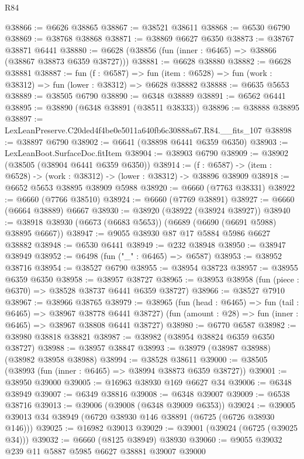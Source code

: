\begin{lexlean}{R84}
\begin{coremodule}
@38866 := @6626 @38865
@38867 := @38521 @38611
@38868 := @6530 @6790
@38869 := @38768 @38868
@38871 := @38869 @6627 @6350
@38873 := @38767 @38871 @6441
@38880 := @6628 (@38856 (fun (inner : @6465) => @38866 (@38867 @38873 @6359 @38727)))
@38881 := @6628 @38880
@38882 := @6628 @38881
@38887 := fun (f : @6587) =>
  fun (item : @6528) => fun (work : @38312) => fun (lower : @38312) => @6628 @38882
@38888 := @6635 @5653
@38889 := @38505 @6790
@38890 := @6348 @38889
@38891 := @6562 @6441
@38895 := @38890 (@6348 @38891 (@38511 @38333))
@38896 := @38888 @38895
@38897 := LexLeanPreserve.C20ded4f4be0e5011a640fb6c30888a67.R84.__fits_107
@38898 := @38897 @6790
@38902 := @6641 (@38898 @6441 @6359 @6350)
@38903 := LexLeanBoot.SurfaceDoc.fitItem
@38904 := @38903 @6790
@38909 := @38902 (@38505 (@38904 @6441 @6359 @6350))
@38914 := (f : @6587) -> (item : @6528) -> (work : @38312) -> (lower : @38312) -> @38896 @38909
@38918 := @6652 @5653 @38895 @38909 @5988
@38920 := @6660 (@7763 @38331)
@38922 := @6660 (@7766 @38510)
@38924 := @6660 (@7769 @38891)
@38927 := @6660 (@6664 @38889) @6667
@38930 := @38920 (@38922 (@38924 @38927))
@38940 := @38918 @38930 (@6673 (@6683 @5653)) (@6689 (@6690 (@6691 @5988) @38895 @6667))
@38947 := @9055 @38930 @87 @17 @5884 @5986 @6627 @38882
@38948 := @6530 @6441
@38949 := @232 @38948
@38950 := @38947 @38949
@38952 := @6498 (fun ("_" : @6465) => @6587)
@38953 := @38952 @38716
@38954 := @38527 @6790
@38955 := @38954 @38723
@38957 := @38955 @6359 @6350
@38958 := @38957 @38727
@38965 := @38953 @38958 (fun (piece : @6370) => @38528 @38737 @6441 @6359 @38727)
@38966 := @38527 @7910
@38967 := @38966 @38765
@38979 := @38965
    (fun (head : @6465) => fun (tail : @6465) => @38967 @38778 @6441 @38727)
    (fun (amount : @28) => fun (inner : @6465) => @38967 @38808 @6441 @38727)
@38980 := @6770 @6587
@38982 := @38980 @38818 @38821
@38987 := @38982 (@38954 @38824 @6359 @6350 @38727)
@38988 := @38957 @38847
@38993 := @38979 (@38987 @38988) (@38982 @38958 @38988)
@38994 := @38528 @38611
@39000 := @38505 (@38993 (fun (inner : @6465) => @38994 @38873 @6359 @38727))
@39001 := @38950 @39000
@39005 := @16963 @38930 @169 @6627 @34
@39006 := @6348 @38949
@39007 := @6349 @38816
@39008 := @6348 @39007
@39009 := @6538 @38716
@39013 := @39006 (@39008 (@6348 @39009 @6353))
@39024 := @39005 @39013 @34 @38949 (@6720 @38930 @146 @38891 (@6725 (@6726 @38930 @146)))
@39025 := @16982 @39013
@39029 := @39001 (@39024 (@6725 (@39025 @34)))
@39032 := @6660 (@8125 @38949) @38930
@39060 := @9055
    @39032
    @239
    @11
    @5887
    @5985
    @6627
    @38881
    @39007
    @39000

\end{coremodule}
\end{lexlean}
